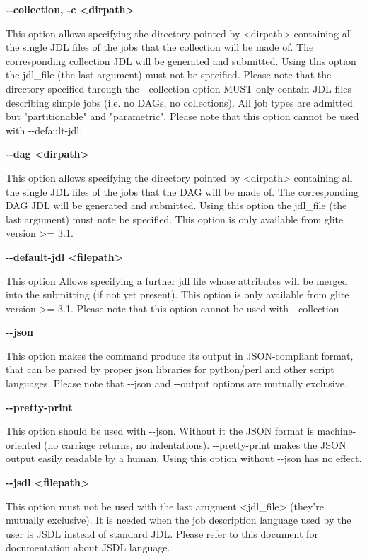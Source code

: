 \textbf{-{}-collection, -c <dirpath>}

This option allows specifying  the directory pointed by <dirpath> containing all the single JDL files of the jobs that the collection will be made of. The corresponding collection JDL will be generated and submitted. Using this option the jdl\_file (the last argument) must not be specified. Please note that the directory specified through the -{}-collection option MUST only contain JDL files describing simple jobs (i.e. no DAGs, no collections). All job types are admitted but "partitionable" and "parametric". Please note that this option cannot be used with -{}-default-jdl.




\textbf{-{}-dag <dirpath>}

This option allows specifying  the directory pointed by <dirpath> containing all the single JDL files of the jobs that the DAG will be made of. The corresponding DAG JDL will be generated and submitted. Using this option the jdl\_file (the last argument) must note be specified.
This option is only available from glite version >= 3.1.




\textbf{-{}-default-jdl <filepath>}

This option Allows specifying a further jdl file whose attributes will be merged into the submitting (if not yet present).
This option is only available from glite version >= 3.1. Please note that this
option cannot be used with -{}-collection




\textbf{-{}-json}

This option makes the command produce its output in JSON-compliant format, that can be parsed by proper json libraries for python/perl and other script languages. Please note that -{}-json and -{}-output options are mutually exclusive.




\textbf{-{}-pretty-print}

This option should be used with -{}-json. Without it the JSON format is machine-oriented (no carriage returns, no indentations). -{}-pretty-print makes the JSON output easily readable by a human. Using this option without -{}-json has no effect.




\textbf{-{}-jsdl <filepath>}

This option must not be used with the last arugment <jdl\_file> (they're mutually exclusive). It is needed when the job description language used by the user is JSDL instead of standard JDL. Please refer to this document \cite{JSDL} for documentation about JSDL language.



